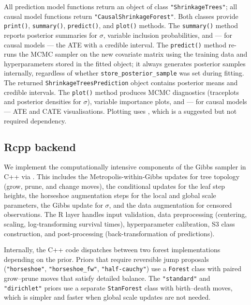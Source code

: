 All prediction model functions return an object of class \texttt{"ShrinkageTrees"}; all causal model functions return \texttt{"CausalShrinkageForest"}. Both classes provide \texttt{print()}, \texttt{summary()}, \texttt{predict()}, and \texttt{plot()} methods. The \texttt{summary()} method reports posterior summaries for \(\sigma\), variable inclusion probabilities, and --- for causal models --- the ATE with a credible interval. The \texttt{predict()} method re-runs the MCMC sampler on the new covariate matrix using the training data and hyperparameters stored in the fitted object; it always generates posterior samples internally, regardless of whether \texttt{store\_posterior\_sample} was set during fitting. The returned \texttt{ShrinkageTreesPrediction} object contains posterior means and credible intervals. The \texttt{plot()} method produces MCMC diagnostics (traceplots and posterior densities for \(\sigma\)), variable importance plots, and --- for causal models --- ATE and CATE visualisations. Plotting uses , which is a suggested but not required dependency.

\subsection{Rcpp backend}\label{rcpp-backend}

We implement the computationally intensive components of the Gibbs sampler in C++ via . This includes the Metropolis-within-Gibbs updates for tree topology (grow, prune, and change moves), the conditional updates for the leaf step heights, the horseshoe augmentation steps for the local and global scale parameters, the Gibbs update for \(\sigma\), and the data augmentation for censored observations. The R layer handles input validation, data preprocessing (centering, scaling, log-transforming survival times), hyperparameter calibration, S3 class construction, and post-processing (back-transformation of predictions).

Internally, the C++ code dispatches between two forest implementations depending on the prior. Priors that require reversible jump proposals (\texttt{"horseshoe"}, \texttt{"horseshoe\_fw"}, \texttt{"half-cauchy"}) use a \texttt{Forest} class with paired grow--prune moves that satisfy detailed balance. The \texttt{"standard"} and \texttt{"dirichlet"} priors use a separate \texttt{StanForest} class with birth--death moves, which is simpler and faster when global scale updates are not needed.

